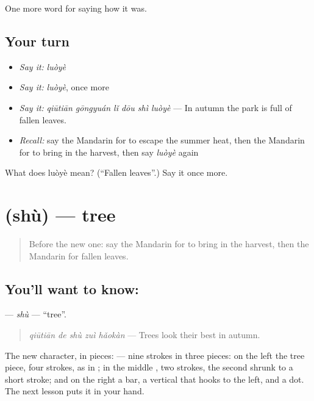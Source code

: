 \begin{grammarlens}[title={What you've built}]
One more word for saying how it was.
\end{grammarlens}

\subsection*{Your turn}
\begin{itemize}
\raggedright
  \item \emph{Say it:} \emph{luòyè}
  \item \emph{Say it:} \emph{luòyè}, once more
  \item \emph{Say it:} \emph{qiūtiān gōngyuán lǐ dōu shì luòyè} — In autumn the park is full of fallen leaves.
  \item \emph{Recall:} say the Mandarin for to escape the summer heat, then the Mandarin for to bring in the harvest, then say \emph{luòyè} again
\end{itemize}

\begin{tcolorbox}[breakable,colback=teal!4,colframe=teal!35!black,title={Before you move on}]
What does luòyè mean? (\textquotedblleft{}Fallen leaves\textquotedblright{}.) Say it once more.
\end{tcolorbox}
\section[\texorpdfstring{\zh{树} (shù)}{树 (shù)}]{ (shù) — tree}

\label{lesson:ZH-C516-shu-tree}



\begin{quote}
Before the new one: say the Mandarin for to bring in the harvest, then the Mandarin for fallen leaves.
\end{quote}

\subsection*{You'll want to know: }
\textbf{} — \emph{shù} — \textquotedblleft{}tree\textquotedblright{}.

\begin{quote}
\textbf{} \emph{qiūtiān de shù zuì hǎokàn} — Trees look their best in autumn.
\end{quote}

The new character, in pieces:  — nine strokes in three pieces: on the left the tree piece, four strokes, as in ; in the middle , two strokes, the second shrunk to a short stroke; and on the right a bar, a vertical that hooks to the left, and a dot. The next lesson puts it in your hand.

